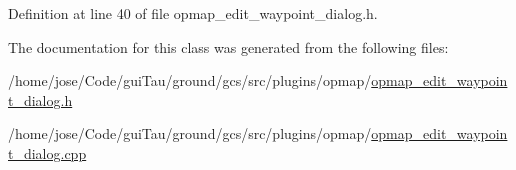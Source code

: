 Definition at line 40 of file opmap\-\_\-edit\-\_\-waypoint\-\_\-dialog.\-h.



The documentation for this class was generated from the following files\-:\begin{DoxyCompactItemize}
\item 
/home/jose/\-Code/gui\-Tau/ground/gcs/src/plugins/opmap/\hyperlink{opmap__edit__waypoint__dialog_8h}{opmap\-\_\-edit\-\_\-waypoint\-\_\-dialog.\-h}\item 
/home/jose/\-Code/gui\-Tau/ground/gcs/src/plugins/opmap/\hyperlink{opmap__edit__waypoint__dialog_8cpp}{opmap\-\_\-edit\-\_\-waypoint\-\_\-dialog.\-cpp}\end{DoxyCompactItemize}
